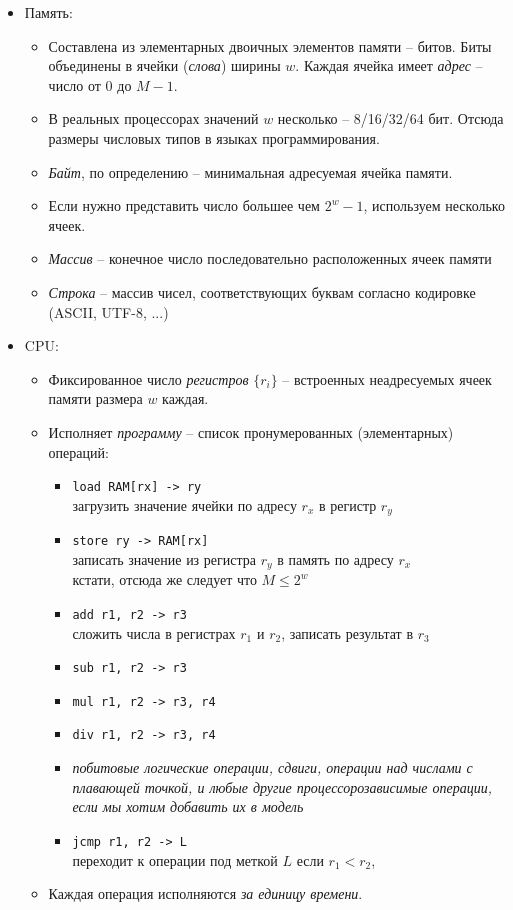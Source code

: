 \documentclass[12pt,a4paper]{report}
\begin{document}
\begin{itemize}
  \item Память: 
  \begin{itemize}
    \item Составлена из элементарных двоичных элементов памяти -- битов. Биты объединены в ячейки ({\em слова}) ширины $w$. Каждая ячейка имеет {\em адрес} -- число от $0$ до $M-1$.
    \item В реальных процессорах значений $w$ несколько -- 8/16/32/64 бит. Отсюда размеры числовых типов в языках программирования.
    \item {\em Байт}, по определению -- минимальная адресуемая ячейка памяти.
    \item Если нужно представить число большее чем $2^w-1$, используем несколько ячеек.
    \item {\em Массив} -- конечное число последовательно расположенных ячеек памяти
    \item {\em Строка} -- массив чисел, соответствующих буквам согласно кодировке (ASCII, UTF-8, ...)
  \end{itemize}
  \item CPU: 
  \begin{itemize}
    \item Фиксированное число {\em регистров} $\{r_i\}$ -- встроенных неадресуемых ячеек памяти размера $w$ каждая.
    \item Исполняет {\em программу} -- список пронумерованных (элементарных) операций:
    \begin{itemize}
      \item {\tt load RAM[rx] -> ry}\\
          загрузить значение ячейки по адресу $r_x$ в регистр $r_y$
      \item {\tt store ry -> RAM[rx]}\\
            записать значение из регистра $r_y$ в память по адресу $r_x$\\
            кстати, отсюда же следует что $M \leq 2^w$
      \item {\tt add r1, r2 -> r3}\\
          сложить числа в регистрах $r_1$ и $r_2$, записать результат в $r_3$
      \item {\tt sub r1, r2 -> r3}
      \item {\tt mul r1, r2 -> r3, r4}
      \item {\tt div r1, r2 -> r3, r4}
      \item {\em побитовые логические операции, сдвиги, операции над числами с плавающей точкой, и любые другие процессорозависимые операции, если мы хотим добавить их в модель}
      \item {\tt jcmp r1, r2 -> L}\\
          переходит к операции под меткой $L$ если $r_1 < r_2$,
    \end{itemize}
    \item Каждая операция исполняются {\em за единицу времени}.
  \end{itemize}
\end{itemize}
\end{document}
